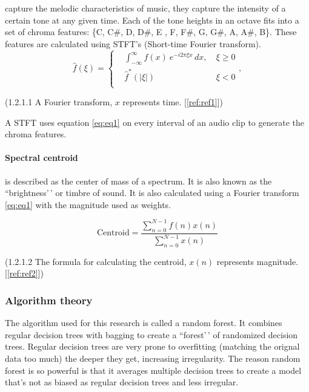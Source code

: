 \documentclass[
]{article}
\begin{document}
capture the melodic characteristics of music, they capture the intensity
of a certain tone at any given time. Each of the tone heights in an
octave fits into a set of chroma features: \{C, C\#, D, D\#, E , F, F\#,
G, G\#, A, A\#, B\}. These features are calculated using STFT's
(Short-time Fourier transform). \[
{\displaystyle {\hat {f}}(\xi )=\left\{{\begin{aligned}&\int _{-\infty }^{\infty }f(x)\ e^{-i2\pi \xi x}\,dx,\ &\xi \geq 0\\&{\hat {f}}^{*}(|\xi |)&\xi <0\\\end{aligned}}\right.,}
\]

\begin{center}
(\label{eq:eq1}1.2.1.1 A Fourier transform, $x$ represents time. [\ref{ref:ref1}])
\end{center}

A STFT uses equation \ref{eq:eq1} on every interval of an audio clip to
generate the chroma features.

\hypertarget{spectral-centroid}{%
\paragraph{Spectral centroid}\label{spectral-centroid}}

is described as the center of mass of a spectrum. It is also known as
the ``brightness'\,' or timbre of sound. It is also calculated using a
Fourier transform \ref{eq:eq1} with the magnitude used as weights.

\[
{\displaystyle \mathrm {Centroid} ={\frac {\sum _{n=0}^{N-1}f(n)x(n)}{\sum _{n=0}^{N-1}x(n)}}}
\]

\begin{center}
(\label{eq:eq2}1.2.1.2 The formula for calculating the centroid, $x(n)$ represents magnitude. [\ref{ref:ref2}])
\end{center}

\hypertarget{algorithm-theory}{%
\subsubsection{Algorithm theory}\label{algorithm-theory}}

The algorithm used for this research is called a random forest. It
combines regular decision trees with bagging to create a ``forest'\,' of
randomized decision trees. Regular decision trees are very prone to
overfitting (matching the orignal data too much) the deeper they get,
increasing irregularity. The reason random forest is so powerful is that
it averages multiple decision trees to create a model that's not as
biased as regular decision trees and less irregular.
\end{document}
